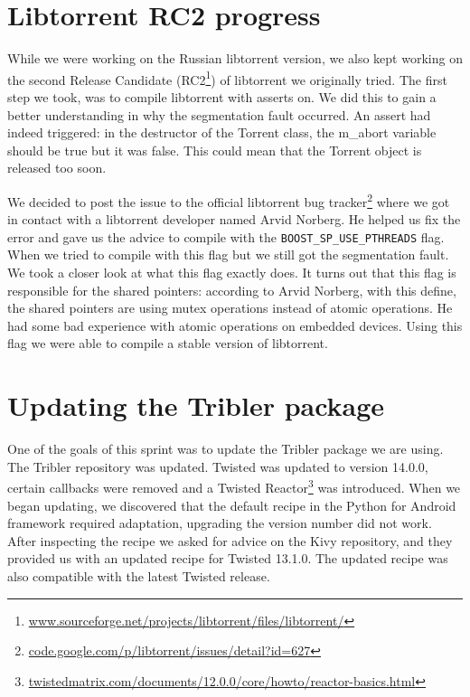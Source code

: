 	\section{Libtorrent RC2 progress}
		While we were working on the Russian libtorrent version, we also kept working on the second Release Candidate (RC2\footnote{\href{http://sourceforge.net/projects/libtorrent/files/libtorrent/}{www.sourceforge.net/projects/libtorrent/files/libtorrent/}}) of libtorrent we originally tried. The first step we took, was to compile libtorrent with asserts on. We did this to gain a better understanding in why the segmentation fault occurred. An assert had indeed triggered: in the destructor of the Torrent class, the m\_abort variable should be true but it was false. This could mean that the Torrent object is released too soon.
		
		We decided to post the issue to the official libtorrent bug tracker\footnote{\href{https://code.google.com/p/libtorrent/issues/detail?id=627}{code.google.com/p/libtorrent/issues/detail?id=627}} where we got in contact with a libtorrent developer named Arvid Norberg. He helped us fix the error and gave us the advice to compile with the \texttt{BOOST\_SP\_USE\_PTHREADS} flag. When we tried to compile with this flag but we still got the segmentation fault. We took a closer look at what this flag exactly does. It turns out that this flag is responsible for the shared pointers: according to Arvid Norberg, with this define, the shared pointers are using mutex operations instead of atomic operations. He had some bad experience with atomic operations on embedded devices. Using this flag we were able to compile a stable version of libtorrent.
				
	\section{Updating the Tribler package}
		One of the goals of this sprint was to update the Tribler package we are using. The Tribler repository was updated. Twisted was updated to version 14.0.0, certain callbacks were removed and a Twisted Reactor\footnote{\href{https://twistedmatrix.com/documents/12.0.0/core/howto/reactor-basics.html}{twistedmatrix.com/documents/12.0.0/core/howto/reactor-basics.html}} was introduced.
		When we began updating, we discovered that the default recipe in the Python for Android framework required adaptation, upgrading the version number did not work. After inspecting the recipe we asked for advice on the Kivy repository, and they provided us with an updated recipe for Twisted 13.1.0. The updated recipe was also compatible with the latest Twisted release.
		
